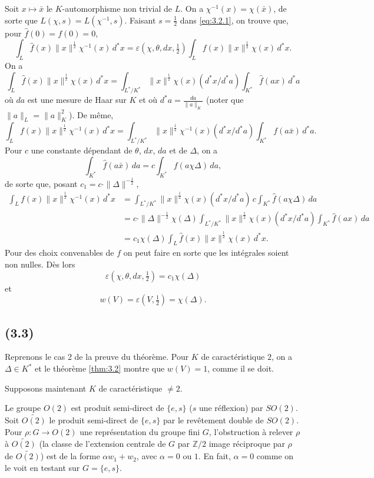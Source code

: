 \documentclass[11pt]{amsart}
\theoremstyle{plain}
\theoremstyle{definition}
\newcommand{\Z}{\mathbb{Z}}
\begin{document}
Soit $x\mapsto\bar{x}$ le $K$-automorphisme non trivial de $L$. On a $\chi^{-1}(x)=\chi(\bar{x})$, de sorte que $L(\chi,s)=L(\chi^{-1},s)$. Faisant $s=\tfrac12$ dans \eqref{eq:3.2.1}, on trouve que, pour $\hat{f}(0)=f(0)=0$,
\[
\int_L\hat{f}(x)\|x\|^{\frac12}\chi^{-1}(x)\,d^*x=\varepsilon(\chi,\theta,dx,\tfrac12)\int_L f(x)\|x\|^{\frac12}\chi(x)\,d^*x.
\]
On a
\[
\int_L\hat{f}(x)\|x\|^{\frac12}\chi(x)\,d^*x=\int_{L^*/K^*}\|x\|^{\frac12}\chi(x)(d^*x/d^*a)\int_{K^*}\hat{f}(ax)\,d^*a
\]
o\`u $da$ est une mesure de Haar sur $K$ et o\`u $d^*a=\frac{da}{\|a\|_K}$ (noter que $\|a\|_L=\|a\|_K^2$). De m\^eme,
\[
\int_L f(x)\|x\|^{\frac12}\chi^{-1}(x)\,d^*x=\int_{L^*/K^*}\|x\|^{\frac12}\chi^{-1}(x)(d^*x/d^*a)\int_{K^*}f(a\bar{x})\,d^*a.
\]
Pour $c$ une constante d\'ependant de $\theta$, $dx$, $da$ et de $\Delta$, on a
\[
\int_{K^*}\hat{f}(a\bar{x})\,da=c\int_{K^*}f(a\chi\Delta)\,da,
\]
de sorte que, posant $c_1=c\cdot\|\Delta\|^{-\frac12}$,
\begin{align*}
\int_L f(x)\|x\|^{\frac12}\chi^{-1}(x)\,d^*x&=\int_{L^*/K^*}\|x\|^{\frac12}\chi(x)(d^*x/d^*a)\,c\int_{K^*}\hat{f}(a\chi\Delta)\,da \\
&=c\cdot\|\Delta\|^{-\frac12}\chi(\Delta)\int_{L^*/K^*}\|x\|^{\frac12}\chi(x)(d^*x/d^*a)\int_{K^*}\hat{f}(ax)\,da \\
&=c_1\chi(\Delta)\int_L\hat{f}(x)\|x\|^{\frac12}\chi(x)\,d^*x.
\end{align*}
Pour des choix convenables de $f$ on peut faire en sorte que les int\'egrales soient non nulles. D\`es lors
\[
\varepsilon(\chi,\theta,dx,\tfrac12)=c_1\chi(\Delta)
\]
et
\[
w(V)=\varepsilon(V,\tfrac12)=\chi(\Delta).
\]

\subsection{(3.3)}
Reprenons le cas 2 de la preuve du th\'eor\`eme. Pour $K$ de caract\'eristique $2$, on a $\Delta\in K^*$ et le th\'eor\`eme \ref{thm:3.2} montre que $w(V)=1$, comme il se doit.

Supposons maintenant $K$ de caract\'eristique $\neq2$.

Le groupe $O(2)$ est produit semi-direct de $\{e,s\}$ ($s$ une r\'eflexion) par $SO(2)$. Soit $\widetilde{O(2)}$ le produit semi-direct de $\{e,s\}$ par le rev\^etement double de $SO(2)$. Pour $\rho\colon G\to O(2)$ une repr\'esentation du groupe fini $G$, l'obstruction \`a relever $\rho$ \`a $\widetilde{O(2)}$ (la classe de l'extension centrale de $G$ par $\Z/2$ image r\'eciproque par $\rho$ de $\widetilde{O(2)}$) est de la forme $\alpha w_1+w_2$, avec $\alpha=0$ ou $1$. En fait, $\alpha=0$ comme on le voit en testant sur $G=\{e,s\}$.
\end{document}
